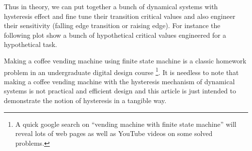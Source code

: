 \documentclass[12pt]{article}
\begin{document}
Thus in theory, we can put together a bunch of dynamical systems with hysteresis effect and fine tune their transition critical values and also engineer their sensitivity (falling edge transition or raising edge). For instance the following plot show a bunch of hypothetical critical values engineered for a hypothetical task.



Making a coffee vending machine using finite state machine is a classic homework problem in an undergraduate digital design course \footnote{A quick google search on ``vending machine with finite state machine'' will reveal lots of web pages as well as YouTube videos on some solved problems.}. It is needless to note that making a coffee vending machine with the hysteresis mechanism of dynamical systems is not practical and efficient design and this article is just intended to demonstrate the notion of hysteresis in a tangible way.
\end{document}
